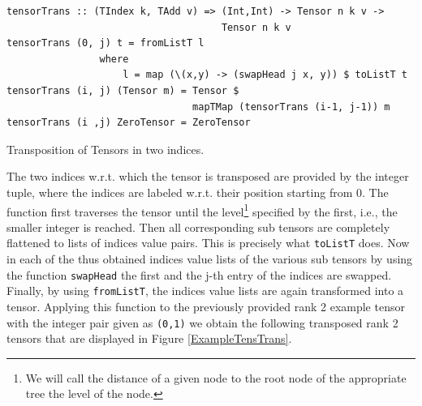 \documentclass[a4paper,12pt, DIV=14, BCOR=5mm, twoside, headsepline, numbers=noenddot]{scrbook}
\begin{document}
\begin{listing}[hbt!]
\begin{verbatim}
tensorTrans :: (TIndex k, TAdd v) => (Int,Int) -> Tensor n k v ->
                                     Tensor n k v
tensorTrans (0, j) t = fromListT l
                where
                    l = map (\(x,y) -> (swapHead j x, y)) $ toListT t
tensorTrans (i, j) (Tensor m) = Tensor $
                                mapTMap (tensorTrans (i-1, j-1)) m
tensorTrans (i ,j) ZeroTensor = ZeroTensor
\end{verbatim}
\caption{Transposition of Tensors in two indices.}\label{TensorTrans}
\end{listing}

The two indices w.r.t. which the tensor is transposed are provided by the integer tuple, where the indices are labeled w.r.t. their position starting from 0. The function first traverses the tensor until the level\footnote{We will call the distance of a given node to the root node of the appropriate tree the level of the node.} specified by the first, i.e., the smaller integer is reached. Then all corresponding sub tensors are completely flattened to lists of indices value pairs. This is precisely what \texttt{toListT} does. Now in each of the thus obtained indices value lists of the various sub tensors by using the function \texttt{swapHead} the first and the j-th entry of the indices are swapped. Finally, by using  \texttt{fromListT}, the indices value lists are again transformed into a tensor.  Applying this function to the previously provided rank 2 example tensor with the integer pair given as \texttt{(0,1)} we obtain the following transposed rank 2 tensors that are displayed in Figure \ref{ExampleTensTrans}.
\end{document}
